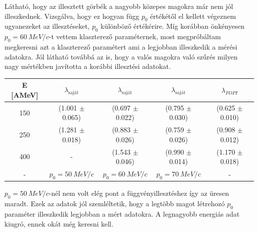 \documentclass[a4paper,12pt]{article}
\begin{document}
\vspace{5mm}

\par Látható, hogy az illesztett görbék a nagyobb közepes magokra már nem jól illeszkednek. Vizsgálva, hogy ez hogyan függ $p_{0}$ értékétől el kellett végeznem ugyanezeket az illesztéseket, $p_{0}$ különböző értékérire. Míg korábban önkényesen $p_{0} = 60 ~MeV/c$-t vettem klaszterező paraméternek, most megpróbáltam megkeresni azt a klaszterező paramétert ami a legjobban illeszkedik a mérési adatokra. Jól látható továbbá az is, hogy a valós magokra való szűrés milyen nagy mértékben javította a korábbi illesztési adatokat. 

\vspace{5mm}

\begin{center}
\begin{tabular}{|c|c|c|c|c|}
\hline
E [AMeV] & $\lambda_{\text{saját}}$ & $\lambda_{\text{saját}}$ & $\lambda_{\text{saját}}$& $\lambda_{FOPI}$\\
\hline
150 & (1.001 $\pm$ 0.065)&(0.697 $\pm$ 0.022) & (0.795 $\pm$ 0.030) &(0.625 $\pm$ 0.010)\\
\hline
250  & (1.281 $\pm$ 0.018)&(0.883 $\pm$ 0.026) & (0.759 $\pm$ 0.026) &(0.908 $\pm$ 0.012)\\
\hline
400 & - &(1.543 $\pm$ 0.046) & (0.990 $\pm$ 0.014) &(1.170 $\pm$ 0.018) \\
\hline
- & $p_{0} = 50 ~MeV/c$ & $p_{0} = 60 ~MeV/c$&  $p_{0} = 70 ~MeV/c$  & - \\
\hline
\end{tabular}
\end{center}

\vspace{5mm}

\par $p_{0} = 50 ~MeV/c$-nél nem volt elég pont a függvényillesztéshez így az üresen maradt. Ezek az adatok jól szemléltetik, hogy a legtöbb magot létrehozó $p_{0}$ paraméter illeszkedik legjobban a mért adatokra. A legnagyobb energiás adat kiugró, ennek okát még keresni kell.

\vspace{5mm}
\end{document}
